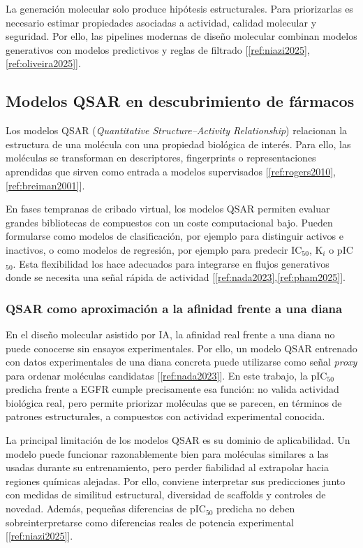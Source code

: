 \documentclass[IB]{TFUOC}%
\begin{document}
La generación molecular solo produce hipótesis estructurales. Para priorizarlas es necesario estimar propiedades asociadas a actividad, calidad molecular y seguridad. Por ello, las pipelines modernas de diseño molecular combinan modelos generativos con modelos predictivos y reglas de filtrado [\ref{ref:niazi2025},\ref{ref:oliveira2025}].

\subsection{Modelos QSAR en descubrimiento de fármacos}

Los modelos QSAR (\textit{Quantitative Structure--Activity Relationship}) relacionan la estructura de una molécula con una propiedad biológica de interés. Para ello, las moléculas se transforman en descriptores, fingerprints o representaciones aprendidas que sirven como entrada a modelos supervisados [\ref{ref:rogers2010},\ref{ref:breiman2001}].

En fases tempranas de cribado virtual, los modelos QSAR permiten evaluar grandes bibliotecas de compuestos con un coste computacional bajo. Pueden formularse como modelos de clasificación, por ejemplo para distinguir activos e inactivos, o como modelos de regresión, por ejemplo para predecir IC$_{50}$, K$_i$ o pIC$_{50}$. Esta flexibilidad los hace adecuados para integrarse en flujos generativos donde se necesita una señal rápida de actividad [\ref{ref:nada2023},\ref{ref:pham2025}].

\subsubsection{QSAR como aproximación a la afinidad frente a una diana}

En el diseño molecular asistido por IA, la afinidad real frente a una diana no puede conocerse sin ensayos experimentales. Por ello, un modelo QSAR entrenado con datos experimentales de una diana concreta puede utilizarse como señal \textit{proxy} para ordenar moléculas candidatas [\ref{ref:nada2023}]. En este trabajo, la pIC$_{50}$ predicha frente a EGFR cumple precisamente esa función: no valida actividad biológica real, pero permite priorizar moléculas que se parecen, en términos de patrones estructurales, a compuestos con actividad experimental conocida.

La principal limitación de los modelos QSAR es su dominio de aplicabilidad. Un modelo puede funcionar razonablemente bien para moléculas similares a las usadas durante su entrenamiento, pero perder fiabilidad al extrapolar hacia regiones químicas alejadas. Por ello, conviene interpretar sus predicciones junto con medidas de similitud estructural, diversidad de scaffolds y controles de novedad. Además, pequeñas diferencias de pIC$_{50}$ predicha no deben sobreinterpretarse como diferencias reales de potencia experimental [\ref{ref:niazi2025}].
\end{document}
